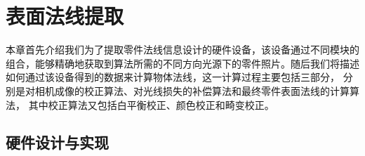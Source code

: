 
\chapter{表面法线提取}

本章首先介绍我们为了提取零件法线信息设计的硬件设备，该设备通过不同模块的组合，能够精确地获取到算法所需的不同方向光源下的零件照片。随后我们将描述如何通过该设备得到的数据来计算物体法线，这一计算过程主要包括三部分，
分别是对相机成像的校正算法、对光线损失的补偿算法和最终零件表面法线的计算算法，
其中校正算法又包括白平衡校正、颜色校正和畸变校正。

\section{硬件设计与实现}
\label{section:yingjianshebeidesheji}

